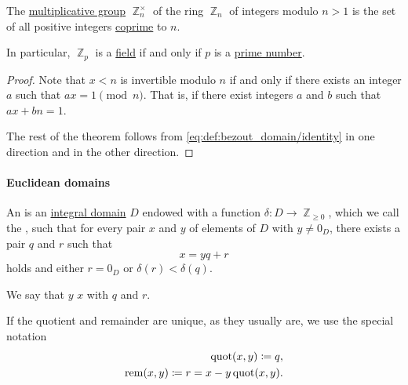 \begin{proposition}\label{thm:multiplicative_group_of_integers_modulo}
  The \hyperref[def:semiring]{multiplicative group} \( \BbbZ_n^\times \) of the ring \hyperref[def:ring_of_integers_modulo]{\( \BbbZ_n \)} of integers modulo \( n > 1 \) is the set of all positive integers \hyperref[def:coprime_elements]{coprime} to \( n \).
\end{proposition}
\begin{comments}
  \item In particular, \( \BbbZ_p \) is a \hyperref[def:field]{field} if and only if \( p \) is a \hyperref[def:prime_number]{prime number}.
\end{comments}
\begin{proof}
  Note that \( x < n \) is invertible modulo \( n \) if and only if there exists an integer \( a \) such that \( ax = 1 \pmod n \). That is, if there exist integers \( a \) and \( b \) such that \( ax + bn = 1 \).

  The rest of the theorem follows from \eqref{eq:def:bezout_domain/identity} in one direction and  in the other direction.
\end{proof}

\paragraph{Euclidean domains}

\begin{definition}\label{def:euclidean_domain}
  An  is an \hyperref[def:integral_domain]{integral domain} \( D \) endowed with a function \( \delta: D \to \BbbZ_{\geq 0} \), which we call the , such that for every pair \( x \) and \( y \) of elements of \( D \) with \( y \neq 0_D \), there exists a pair \( q \) and \( r \) such that
  \begin{equation}\label{eq:def:euclidean_domain/division}
    x = yq + r
  \end{equation}
  holds and either \( r = 0_D \) or \( \delta(r) < \delta(q) \).

  We say that \( y \)  \( x \) with  \( q \) and  \( r \).

  If the quotient and remainder are unique, as they usually are, we use the special notation
  \begin{align*}
    \operatorname{quot}(x, y) \coloneqq q, \\
    \operatorname{rem}(x, y) \coloneqq r = x - y \operatorname{quot}(x, y).
  \end{align*}
\end{definition}

